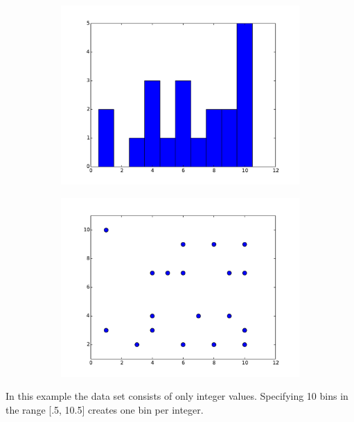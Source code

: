 \begin{figure}[H]
\centering
\begin{subfigure}{.5\textwidth}
    \centering
    \includegraphics[width=\linewidth]{histogram.pdf}
    \label{fig:histogram}
\end{subfigure}%
\begin{subfigure}{.5\textwidth}
    \centering
    \includegraphics[width=\linewidth]{scatter.pdf}
    \label{fig:scatter}
\end{subfigure}
\end{figure}

In this example the data set  consists of only integer values.
Specifying 10 bins in the range [.5, 10.5] creates one bin per integer.

